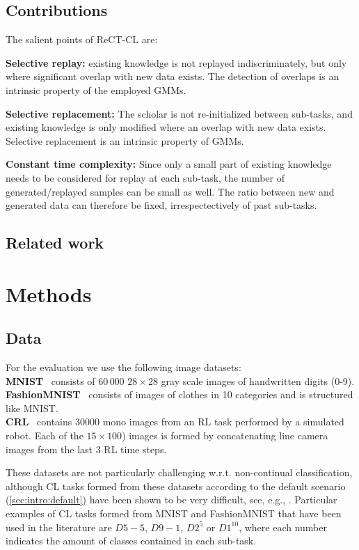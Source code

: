 \documentclass{article} %
\begin{document}
\subsection{Contributions}
The salient points of ReCT-CL are:
%
\par\noindent\textbf{Selective replay:} existing knowledge is not replayed indiscriminately, but only where significant overlap with new data exists. The detection of overlaps is an intrinsic property of the employed GMMs.
%
\par\noindent\textbf{Selective replacement:} The scholar is not re-initialized between sub-tasks, and existing knowledge is only 
modified where an overlap with new data exists. Selective replacement is an intrinsic property of GMMs.
%
\par\noindent\textbf{Constant time complexity:} Since only a small part of existing knowledge needs to be considered for replay at each sub-task, the number of generated/replayed samples can be small as well. The ratio between new and generated data can therefore be fixed, irrespectectively of past sub-tasks.
%
\subsection{Related work}


\section{Methods}
\label{sec:methods}
%
\subsection{Data}\label{sec:data}
\noindent For the evaluation we use the following image datasets:
\smallskip\\
\noindent\textbf{MNIST}~\cite{LeCun1998} consists of $60\,000$ $28$\,$\times$\,$28$ gray scale images of handwritten digits (0-9).\\
\noindent\textbf{FashionMNIST}~\cite{Xiao2017} consists of images of clothes in 10 categories and is structured like MNIST. \\
\noindent\textbf{CRL}~\cite{bagus2022b} contains 30000 mono images from an RL task performed by a simulated robot. Each of the $15$\,$\times$\,$100$) images
is formed by concatenating line camera images from the last 3 RL time steps.

These datasets are not particularly challenging w.r.t. non-continual classification, although CL tasks formed from these datasets according to the default scenario (\cref{sec:intro:default}) have been shown to be very difficult, see, e.g., \cite{clstuff}. Particular examples of CL tasks formed from MNIST and FashionMNIST that have been used in the literature are $D5-5$, $D9-1$, $D2^5$ or $D1^{10}$, where each number indicates the amount of classes contained in each sub-task. 
%
\end{document}
